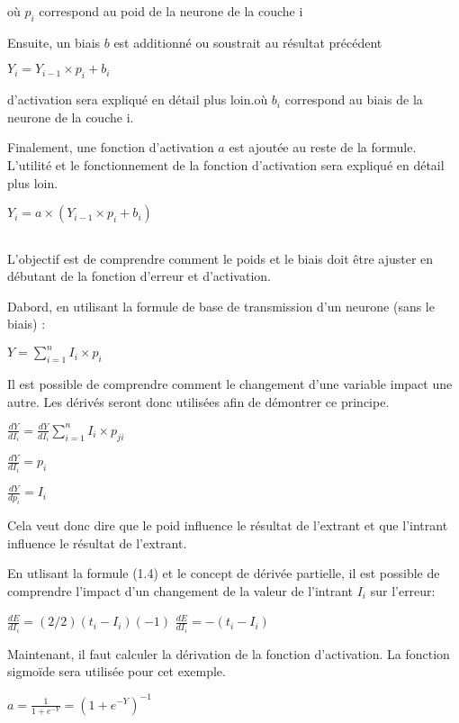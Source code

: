 \documentclass[letterpaper,10pt,french]{sphinxmanual}
\begin{document}
où \(p_{i}\) correspond au poid de la neurone de la couche i

Ensuite, un biais \(b\) est additionné ou soustrait au résultat précédent

\(Y_i = Y_{i-1}\times p_{i} + b_i\) 

d’activation sera expliqué en détail plus loin.où \(b_i\) correspond au biais de la neurone de la couche i.

Finalement, une fonction d’activation \(a\) est ajoutée au reste de la formule. L’utilité et le fonctionnement de
la fonction d’activation sera expliqué en détail plus loin.

\(Y_i = a\times(Y_{i-1}\times p_{i} + b_i)\)


\subsection{}
\label{\detokenize{training:back-propagation}}
L’objectif est de comprendre comment le poids et le biais doit être ajuster en débutant de la fonction d’erreur et d’activation.

Dabord, en utilisant la formule de base de transmission d’un neurone (sans le biais) :

\(Y = \sum_{i=1}^{n} I_i \times p_i \)

Il est possible de comprendre comment le changement d’une variable impact une autre. Les dérivés seront
donc utilisées afin de démontrer ce principe.

\(\frac{dY}{dI_i}=\frac{dY}{dI_i}\sum_{i=1}^{n} I_i \times p_{ji} 
\)

\(\frac{dY}{dI_i} = p_i\)

\(\frac{dY}{dp_i} = I_i\)

Cela veut donc dire que le poid influence le résultat de l’extrant et que l’intrant influence
le résultat de l’extrant.

En utlisant la formule (1.4) et le concept de dérivée partielle, il est possible de comprendre
l’impact d’un changement de la valeur de l’intrant \(I_i\) sur l’erreur:

\(\frac{dE}{dI_i} =  (2/2)(t_i - I_i)(-1) \)
\(\frac{dE}{dI_i}= -(t_i-I_i)\)

Maintenant, il faut calculer la dérivation de la fonction d’activation.
La fonction sigmoïde sera utilisée pour cet exemple.

\(a = \frac{1}{1 + e^{-Y}} =(1+e^{-Y})^{-1}\)
\end{document}
